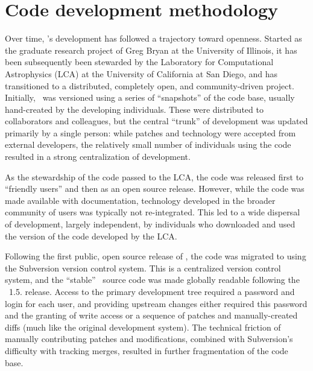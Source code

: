
\section{Code development methodology}
\label{sec.development}

Over time, \enzo's development has followed a trajectory toward
openness.  Started as the graduate research project of Greg Bryan at
the University of Illinois, it has been subsequently been stewarded by
the Laboratory for Computational Astrophysics (LCA) at the University
of California at San Diego, and has transitioned to a distributed,
completely open, and community-driven project.  Initially, \enzo\ was
versioned using a series of ``snapshots'' of the code base, usually
hand-created by the developing individuals.  These were distributed to
collaborators and colleagues, but the central ``trunk'' of development
was updated primarily by a single person: while patches and technology
were accepted from external developers, the relatively small number of
individuals using the code resulted in a strong centralization of
development.

As the stewardship of the code passed to the LCA, the code was
released first to ``friendly users'' and then as an open source
release.  However, while the code was made available with
documentation, technology developed in the broader community of users
was typically not re-integrated.  This led to a wide dispersal of
development, largely independent, by individuals who downloaded and
used the version of the code developed by the LCA.


Following the first public, open source release of \enzo, the code was
migrated to using the Subversion version control system.  This is a
centralized version control system, and the ``stable'' \enzo\ source
code was made globally readable following the \enzo\ 1.5. release.
Access to the primary development tree required a password and login
for each user, and providing upstream changes either required this
password and the granting of write access or a sequence of patches and
manually-created diffs (much like the original development system).
The technical friction of manually contributing patches and
modifications, combined with Subversion's difficulty with tracking
merges, resulted in further fragmentation of the code base.

